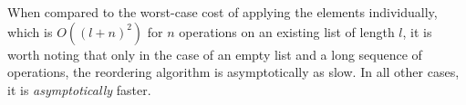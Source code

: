 When compared to the worst-case cost of applying the elements individually,
which is $O\left(\left(l+n\right)^2\right)$ for $n$ operations on an existing
list of length $l$, it is worth noting that only in the case of an empty list
and a long sequence of operations, the reordering algorithm is asymptotically as
slow. In all other cases, it is \emph{asymptotically} faster.

